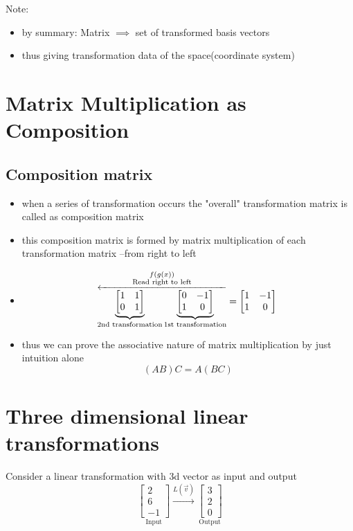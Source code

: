\documentclass[a4paper]{article}
\begin{document}
Note:
\begin{itemize}
	\item by summary: Matrix $\implies$ set of transformed basis vectors
	\item thus giving transformation data of the
	      space(coordinate system)
\end{itemize}


\newpage
\section{Matrix Multiplication as Composition}

\subsection{Composition matrix}
\begin{itemize}
	\item when a series of transformation occurs the
	      "overall" transformation matrix is called
	      as composition matrix
	\item this composition matrix is formed by matrix
	      multiplication of each transformation matrix
	      --from right to left
	\item \[
		      \overset{
		      \substack{
			      f(g(x)) \\
			      \text{Read right to left}
		      }
		      }{
		      \overleftarrow{
		      \underbrace{
			      \begin{bmatrix} 1 & 1 \\
                0 & 1\end{bmatrix}}
		      _{\text{2nd transformation}}
		      \underbrace{
			      \begin{bmatrix} 0 & -1 \\ 1 & 0
			      \end{bmatrix}}
		      _{\text{1st transformation}}
		      }
		      }
		      = \begin{bmatrix} 1 & -1 \\
                1 & 0\end{bmatrix} \\
	      \]
	\item thus we can prove the associative nature of
	      matrix multiplication by just intuition alone
	      \[
		      (AB)C = A(BC)
	      \]
\end{itemize}

\newpage
\section{Three dimensional linear transformations}
Consider a linear transformation with 3d vector as input
and output
\[
	\underset{\text{Input}}{
		\begin{bmatrix} 2 \\ 6 \\ -1 \end{bmatrix}
	}
	\xrightarrow{L (\vec{v})}
	\underset{\text{Output}}{
		\begin{bmatrix} 3 \\ 2 \\ 0 \end{bmatrix}
	}
\]
\end{document}
